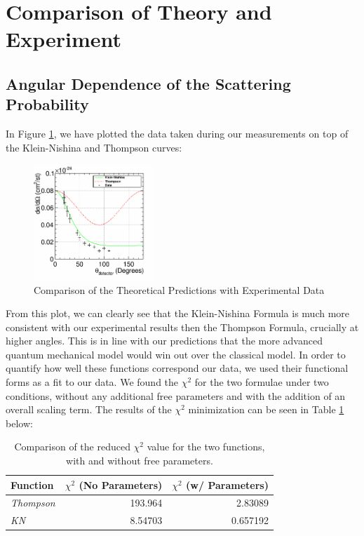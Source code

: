 \documentclass[%
 reprint,
 amsmath,amssymb,
 aps,
 pra,
]{revtex4-1}
\begin{document}
\section{Comparison of Theory and Experiment}

\subsection{Angular Dependence of the Scattering Probability}

In Figure \ref{KN_vs_Thompson_Unscaled}, we have plotted the data taken during our measurements on top of the Klein-Nishina and Thompson curves:

\begin{figure}[H]
	\centering
	\includegraphics[width=0.4\textwidth]{KNvsThompson_Unscaled.png}
	\caption{Comparison of the Theoretical Predictions with Experimental Data}
	\label{KN_vs_Thompson_Unscaled}
\end{figure}

\noindent From this plot, we can clearly see that the Klein-Nishina Formula is much more consistent with our experimental results then the Thompson Formula, crucially at higher angles. This is in line with our predictions that the more advanced quantum mechanical model would win out over the classical model. In order to quantify how well these functions correspond our data, we used their functional forms as a fit to our data. We found the $\chi^2$ for the two formulae under two conditions, without any additional free parameters and with the addition of an overall scaling term. The results of the $\chi^2$ minimization can be seen in Table \ref{table:chi_square} below:

\begin{table}[htbp]
	\begin{center}
		\begin{tabular}{|l|r|r|}
			\hline
			Function & \multicolumn{1}{l|}{$\chi^2$ (No Parameters)} & \multicolumn{1}{l|}{$\chi^2$ (w/ Parameters)} \\ \hline
			\textit{Thompson} & 193.964 & 2.83089 \\ \hline
			\textit{KN} & 8.54703 & 0.657192 \\ \hline
		\end{tabular}
	\end{center}
	\caption{Comparison of the reduced $\chi^2$ value for the two functions, with and without free parameters.}
	\label{table:chi_square}
\end{table}
\end{document}
